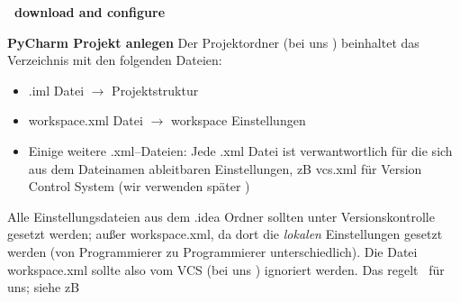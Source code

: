 \textbf{\pycharm~download and configure}
%





\textbf{PyCharm Projekt anlegen}
Der Projektordner (bei uns ) beinhaltet das Verzeichnis  mit den folgenden Dateien:
\begin{itemize}
	\item .iml Datei $\to$ Projektstruktur
	\item workspace.xml Datei $\to$ workspace Einstellungen
	\item Einige  weitere .xml--Dateien:
	Jede .xml Datei ist verwantwortlich für die sich aus dem Dateinamen ableitbaren Einstellungen, zB vcs.xml für Version Control System (wir verwenden später \git)
\end{itemize}
Alle Einstellungsdateien aus dem .idea Ordner sollten unter Versionskontrolle gesetzt werden; außer workspace.xml, da dort die \textit{lokalen} Einstellungen gesetzt werden (von Programmierer zu Programmierer unterschiedlich). Die Datei workspace.xml sollte also vom VCS (bei uns \git) ignoriert werden. Das regelt \pycharm~für uns; siehe zB 


